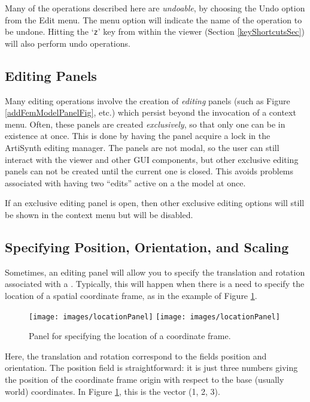 \documentclass{article}
\begin{document}
Many of the operations described here are {\it undoable}, by choosing
the {\sf Undo} option from the {\sf Edit} menu. The menu option will
indicate the name of the operation to be undone. Hitting the `{\tt z}'
key from within the viewer (Section \ref{keyShortcutsSec}) will
also perform undo operations.

\subsection{Editing Panels}

Many editing operations involve the creation of {\it editing} panels (such
as Figure \ref{addFemModelPanelFig}, etc.) which persist beyond the invocation of
a context menu. Often, these panels are created {\it exclusively}, so that
only one can be in existence at once.  This is done by having the
panel acquire a lock in the ArtiSynth editing manager. The panels are
not modal, so the user can still interact with the viewer and other
GUI components, but other exclusive editing panels can not be created
until the current one is closed. This avoids problems associated with
having two ``edits'' active on a the model at once. 

If an exclusive editing panel is open, then other exclusive editing
options will still be shown in the context menu but will be disabled.

\subsection{Specifying Position, Orientation, and Scaling}
\label{positionOrientationScalingSec}

Sometimes, an editing panel will allow you to specify the translation
and rotation associated with a
. Typically, this will happen
when there is a need to specify the location of a spatial coordinate
frame, as in the example of Figure \ref{locationPanelFig}. 

\begin{figure}
\begin{center}
\iflatexml
\texttt{[image: images/locationPanel]}
\else
\texttt{[image: images/locationPanel]}
\fi
\end{center}
\caption{Panel for specifying the location of a coordinate frame.}%
\label{locationPanelFig}
\end{figure}

Here, the translation
and rotation correspond to the fields {\sf position} and
{\sf orientation}. The {\sf position} field is straightforward: it is just three
numbers giving the position of the coordinate frame origin with
respect to the base (usually world) coordinates. In Figure \ref{locationPanelFig},
this is the vector (1, 2, 3).
\end{document}
